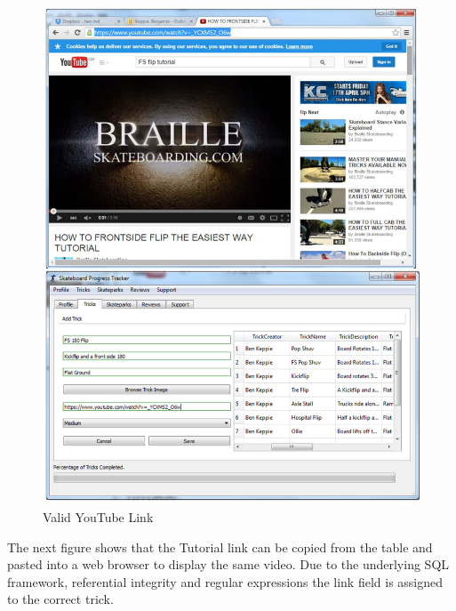 \begin{figure}[H]
    \includegraphics[width=\textwidth]{./Evaluation/images/ValidYouTubeLink.pdf}
    \caption{Valid YouTube Link} \label{fig:ValidYouTubeLink}
\end{figure}

The next figure shows that the Tutorial link can be copied from the table and pasted into a web browser to display the same video. Due to the underlying SQL framework, referential integrity and regular expressions the link field is assigned to the correct trick.

